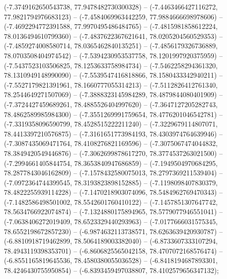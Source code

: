 (-7.3749162650543738, 77.9478482730300328) -- (-7.4463466427116272, 77.9821794976683123) -- (-7.4584069963442259, 77.9884666698978606) -- (-7.4692294772391588, 77.9970495486484765) -- (-7.4815981858612224, 78.0136494610799360) -- (-7.4837622367621641, 78.0205204560529353) -- (-7.4859274008580714, 78.0365462840135251) -- (-7.4856179326736889, 78.0703508404974542) -- (-7.5394230953537758, 78.1201997920375959) -- (-7.5437523103506825, 78.1253633758984734) -- (-7.5462258294361320, 78.1310949148990090) -- (-7.5539547416818866, 78.1580433342940211) -- (-7.5527179821391961, 78.1660777055314213) -- (-7.5112826412761340, 78.2544649271507069) -- (-7.3888323145984289, 78.4879844080401909) -- (-7.3724427459689261, 78.4885526404997620) -- (-7.3647127205282743, 78.4862589985984300) -- (-7.3551269991759654, 78.4776201046542781) -- (-7.3319358096590799, 78.4528515222211240) -- (-7.3229679114807071, 78.4413397210576875) -- (-7.3161651773984193, 78.4303974764639946) -- (-7.3087435069471764, 78.4108276821169596) -- (-7.3075067474044832, 78.3849420549446876) -- (-7.3062699878617270, 78.3774537263021500) -- (-7.2994661405844754, 78.3653840947686859) -- (-7.1949504970684295, 78.2877843046162809) -- (-7.1578432580075013, 78.2797369211539404) -- (-7.0972364744399545, 78.3193823898152885) -- (-7.1198098407830379, 78.4822255939114228) -- (-7.1470218903074096, 78.5484962769470343) -- (-7.1482586498501002, 78.5542601760410122) -- (-7.1457851307647742, 78.5634766922074874) -- (-7.1324880175894965, 78.5779077946551041) -- (-7.0638406272019409, 78.6523329440293963) -- (-7.0177666031575345, 78.6552198672857230) -- (-6.9874632113738571, 78.6263639420930787) -- (-6.8810918719462899, 78.5064189003382040) -- (-6.8733607333107294, 78.4943119398353701) -- (-6.8606825565042158, 78.4707072168576474) -- (-6.8551165819645536, 78.4580380055036528) -- (-6.8418194687893301, 78.4246430755950854) -- (-6.8393459497038807, 78.4102579656347132);
